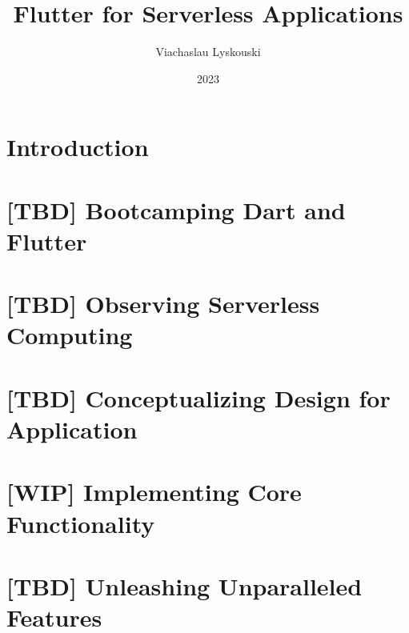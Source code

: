 \documentclass[12pt, a4paper, twoside]{extreport}
\author{Viachaslau Lyskouski}
\title{Flutter for Serverless Applications}
\date{2023}
\begin{document}


\maketitle

%

\tableofcontents



\section*{Introduction}


\newpage
\section{[TBD] Bootcamping Dart and Flutter}


\newpage
\section{[TBD] Observing Serverless Computing}


\newpage
\section{[TBD] Conceptualizing Design for Application}


\newpage
\section{[WIP] Implementing Core Functionality}








\newpage
\section{[TBD] Unleashing Unparalleled Features}

\end{document}

